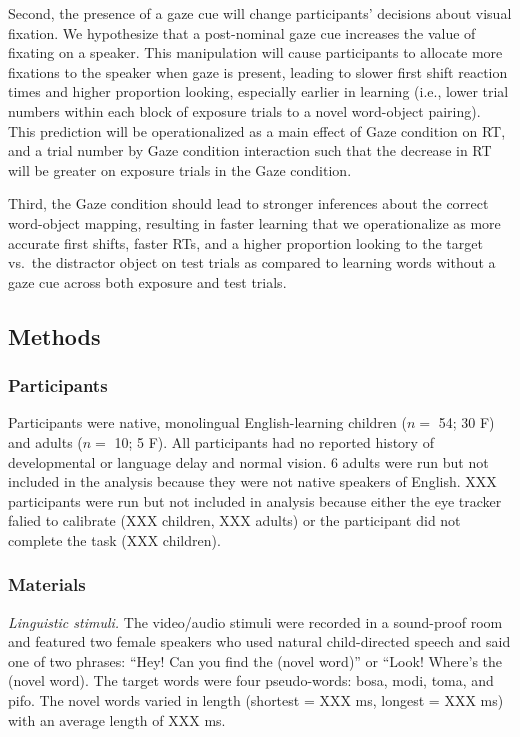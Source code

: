 \documentclass[man,floatsintext]{apa6}
\begin{document}
Second, the presence of a gaze cue will change participants' decisions
about visual fixation. We hypothesize that a post-nominal gaze cue
increases the value of fixating on a speaker. This manipulation will
cause participants to allocate more fixations to the speaker when gaze
is present, leading to slower first shift reaction times and higher
proportion looking, especially earlier in learning (i.e., lower trial
numbers within each block of exposure trials to a novel word-object
pairing). This prediction will be operationalized as a main effect of
Gaze condition on RT, and a trial number by Gaze condition interaction
such that the decrease in RT will be greater on exposure trials in the
Gaze condition.

Third, the Gaze condition should lead to stronger inferences about the
correct word-object mapping, resulting in faster learning that we
operationalize as more accurate first shifts, faster RTs, and a higher
proportion looking to the target vs.~the distractor object on test
trials as compared to learning words without a gaze cue across both
exposure and test trials.

\subsection{Methods}\label{methods-2}

\subsubsection{Participants}\label{participants-2}

Participants were native, monolingual English-learning children (\(n=\)
54; 30 F) and adults (\(n=\) 10; 5 F). All participants had no reported
history of developmental or language delay and normal vision. 6 adults
were run but not included in the analysis because they were not native
speakers of English. XXX participants were run but not included in
analysis because either the eye tracker falied to calibrate (XXX
children, XXX adults) or the participant did not complete the task (XXX
children).

\subsubsection{Materials}\label{materials-2}

\emph{Linguistic stimuli.} The video/audio stimuli were recorded in a
sound-proof room and featured two female speakers who used natural
child-directed speech and said one of two phrases: \enquote{Hey! Can you
find the (novel word)} or ``Look! Where's the (novel word). The target
words were four pseudo-words: bosa, modi, toma, and pifo. The novel
words varied in length (shortest = XXX ms, longest = XXX ms) with an
average length of XXX ms.
\end{document}
